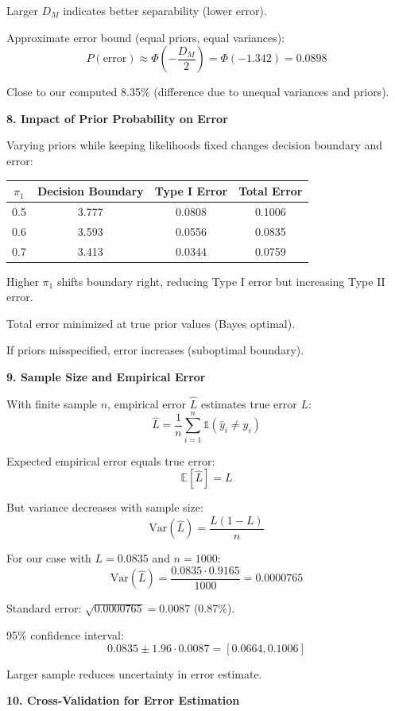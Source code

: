 \documentclass[12pt]{article}
\begin{document}
\begin{explanation}
Larger $D_M$ indicates better separability (lower error).

Approximate error bound (equal priors, equal variances):
\[P(\text{error}) \approx \Phi\left(-\frac{D_M}{2}\right) = \Phi(-1.342) = 0.0898\]

Close to our computed 8.35\% (difference due to unequal variances and priors).

\textbf{8. Impact of Prior Probability on Error}

Varying priors while keeping likelihoods fixed changes decision boundary and error:

\begin{center}
\begin{tabular}{cccc}
$\pi_1$ & Decision Boundary & Type I Error & Total Error \\
\hline
0.5 & 3.777 & 0.0808 & 0.1006 \\
0.6 & 3.593 & 0.0556 & 0.0835 \\
0.7 & 3.413 & 0.0344 & 0.0759 \\
\end{tabular}
\end{center}

Higher $\pi_1$ shifts boundary right, reducing Type I error but increasing Type II error.

Total error minimized at true prior values (Bayes optimal).

If priors misspecified, error increases (suboptimal boundary).

\textbf{9. Sample Size and Empirical Error}

With finite sample $n$, empirical error $\hat{L}$ estimates true error $L$:
\[\hat{L} = \frac{1}{n}\sum_{i=1}^n \mathbb{1}(\hat{y}_i \neq y_i)\]

Expected empirical error equals true error:
\[\mathbb{E}[\hat{L}] = L\]

But variance decreases with sample size:
\[\text{Var}(\hat{L}) = \frac{L(1-L)}{n}\]

For our case with $L = 0.0835$ and $n = 1000$:
\[\text{Var}(\hat{L}) = \frac{0.0835 \cdot 0.9165}{1000} = 0.0000765\]

Standard error: $\sqrt{0.0000765} = 0.0087$ (0.87\%).

95\% confidence interval:
\[0.0835 \pm 1.96 \cdot 0.0087 = [0.0664, 0.1006]\]

Larger sample reduces uncertainty in error estimate.

\textbf{10. Cross-Validation for Error Estimation}


\end{explanation}
\end{document}
